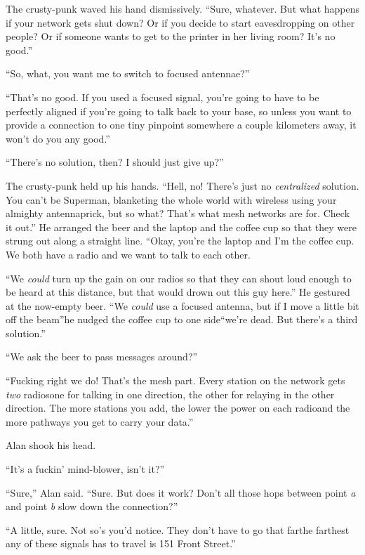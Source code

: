 The crusty-punk waved his hand dismissively.  ``Sure, whatever.  But
what happens if your network gets shut down?  Or if you decide to
start eavesdropping on other people?  Or if someone wants to get to
the printer in her living room?  It's no good.''

``So, what, you want me to switch to focused antennae?''

``That's no good.  If you used a focused signal, you're going to have
to be perfectly aligned if you're going to talk back to your base, so
unless you want to provide a connection to one tiny pinpoint somewhere
a couple kilometers away, it won't do you any good.''

``There's no solution, then?  I should just give up?''

The crusty-punk held up his hands.  ``Hell, no!  There's just no
\textit{centralized} solution.  You can't be Superman, blanketing the
whole world with wireless using your almighty antennaprick, but so
what?  That's what mesh networks are for.  Check it out.'' He arranged
the beer and the laptop and the coffee cup so that they were strung
out along a straight line.  ``Okay, you're the laptop and I'm the
coffee cup.  We both have a radio and we want to talk to each other.

``We \textit{could} turn up the gain on our radios so that they can
shout loud enough to be heard at this distance, but that would drown
out this guy here.'' He gestured at the now-empty beer.  ``We
\textit{could} use a focused antenna, but if I move a little bit off
the beam''\dash{}he nudged the coffee cup to one side\dash{}``we're
dead.  But there's a third solution.''

``We ask the beer to pass messages around?''

``Fucking right we do!  That's the mesh part.  Every station on the
network gets \textit{two} radios\dash{}one for talking in one direction,
the other for relaying in the other direction.  The more stations you
add, the lower the power on each radio\dash{}and the more pathways you get
to carry your data.''

Alan shook his head.

``It's a fuckin' mind-blower, isn't it?''

``Sure,'' Alan said.  ``Sure.  But does it work?  Don't all those hops
between point \textit{a} and point \textit{b} slow down the
connection?''

``A little, sure.  Not so's you'd notice.  They don't have to go that
far\dash{}the farthest any of these signals has to travel is 151 Front
Street.''


